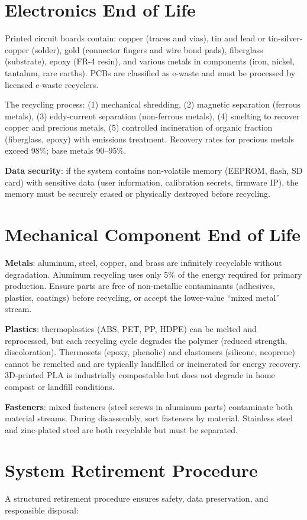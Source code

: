 \documentclass[11pt,letterpaper,twoside,openany]{book}
\begin{document}
\section{Electronics End of Life}
Printed circuit boards contain: copper (traces and vias), tin and lead or tin-silver-copper (solder), gold (connector fingers and wire bond pads), fiberglass (substrate), epoxy (FR-4 resin), and various metals in components (iron, nickel, tantalum, rare earths). PCBs are classified as e-waste and must be processed by licensed e-waste recyclers.

The recycling process: (1) mechanical shredding, (2) magnetic separation (ferrous metals), (3) eddy-current separation (non-ferrous metals), (4) smelting to recover copper and precious metals, (5) controlled incineration of organic fraction (fiberglass, epoxy) with emissions treatment. Recovery rates for precious metals exceed 98\%; base metals 90--95\%.

\textbf{Data security}: if the system contains non-volatile memory (EEPROM, flash, SD card) with sensitive data (user information, calibration secrets, firmware IP), the memory must be securely erased or physically destroyed before recycling.

\section{Mechanical Component End of Life}
\textbf{Metals}: aluminum, steel, copper, and brass are infinitely recyclable without degradation. Aluminum recycling uses only 5\% of the energy required for primary production. Ensure parts are free of non-metallic contaminants (adhesives, plastics, coatings) before recycling, or accept the lower-value ``mixed metal'' stream.

\textbf{Plastics}: thermoplastics (ABS, PET, PP, HDPE) can be melted and reprocessed, but each recycling cycle degrades the polymer (reduced strength, discoloration). Thermosets (epoxy, phenolic) and elastomers (silicone, neoprene) cannot be remelted and are typically landfilled or incinerated for energy recovery. 3D-printed PLA is industrially compostable but does not degrade in home compost or landfill conditions.

\textbf{Fasteners}: mixed fasteners (steel screws in aluminum parts) contaminate both material streams. During disassembly, sort fasteners by material. Stainless steel and zinc-plated steel are both recyclable but must be separated.

\section{System Retirement Procedure}
A structured retirement procedure ensures safety, data preservation, and responsible disposal:
\end{document}
